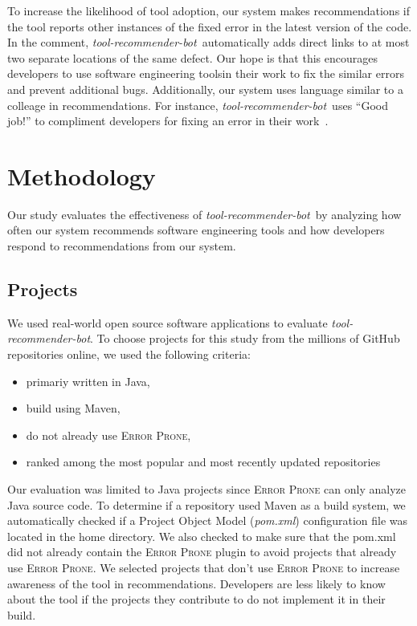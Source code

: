 \documentclass[sigconf,review,anonymous]{acmart}
\newcommand{\tool}{\textsl{tool-recommender-bot}}
\begin{document}
To increase the likelihood of tool adoption, our system makes recommendations if the tool reports other instances of the fixed error in the latest version of the code. In the comment, \tool~automatically adds direct links to at most two separate locations of the same defect. Our hope is that this encourages developers to use software engineering toolsin their work to fix the similar errors and prevent additional bugs. Additionally, our system uses language similar to a colleage in recommendations. For instance, \tool~uses ``Good job!'' to compliment developers for fixing an error in their work~\cite{?}.

\section{Methodology}

Our study evaluates the effectiveness of \tool~by analyzing how often our system recommends software engineering tools and how developers respond to recommendations from our system.

\subsection{Projects}

We used real-world open source software applications to evaluate \tool. To choose projects for this study from the millions of GitHub repositories online, we used the following criteria:

\begin{itemize}
\item primariy written in Java,
\item build using Maven,
\item do not already use \textsc{Error Prone},
\item ranked among the most popular and most recently updated repositories
\end{itemize}

Our evaluation was limited to Java projects since \textsc{Error Prone} can only analyze Java source code. To determine if a repository used Maven as a build system, we automatically checked if a Project Object Model (\textit{pom.xml}) configuration file was located in the home directory. We also checked to make sure that the pom.xml did not already contain the \textsc{Error Prone} plugin to avoid projects that already use \textsc{Error Prone}. We selected projects that don't use \textsc{Error Prone} to increase awareness of the tool in recommendations. Developers are less likely to know about the tool if the projects they contribute to do not implement it in their build. 
\end{document}
